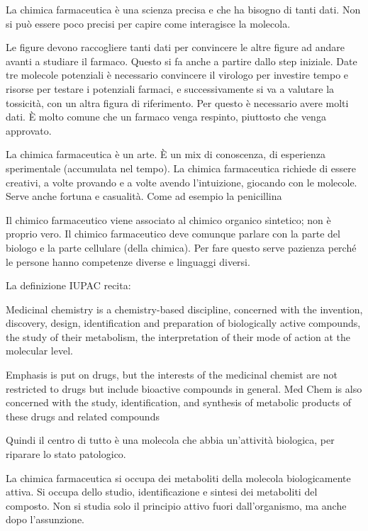 La chimica farmaceutica è una scienza precisa e che ha bisogno di tanti
dati. Non si può essere poco precisi per capire come interagisce la
molecola.

Le figure devono raccogliere tanti dati per convincere le altre figure
ad andare avanti a studiare il farmaco. Questo si fa anche a partire
dallo step iniziale. Date tre molecole potenziali è necessario
convincere il virologo per investire tempo e risorse per testare i
potenziali farmaci, e successivamente si va a valutare la tossicità, con
un altra figura di riferimento. Per questo è necessario avere molti
dati. È molto comune che un farmaco venga respinto, piuttosto che venga
approvato.

La chimica farmaceutica è un arte. È un mix di conoscenza, di esperienza
sperimentale (accumulata nel tempo).
La chimica farmaceutica richiede di essere creativi, a volte provando e
a volte avendo l'intuizione, giocando con le molecole.
Serve anche fortuna e casualità. Come ad esempio la penicillina

Il chimico farmaceutico viene associato al chimico organico sintetico;
non è proprio vero. Il chimico farmaceutico deve comunque parlare con la
parte del biologo e la parte cellulare (della chimica). Per fare questo
serve pazienza perché le persone hanno competenze diverse e linguaggi
diversi.

La definizione IUPAC recita:
\begin{quoting}
Medicinal chemistry is a chemistry-based discipline, concerned with the invention, discovery, design, identification and preparation of
biologically active compounds, the study of their metabolism, the
interpretation of their mode of action at the molecular level.
\end{quoting}
\begin{quoting}
Emphasis is put on drugs, but the interests of the medicinal chemist are
not restricted to drugs but include bioactive compounds in general. Med
Chem is also concerned with the study, identification, and synthesis of
metabolic products of these drugs and related compounds
\end{quoting}

Quindi il centro di tutto è una molecola che abbia un'attività
biologica, per riparare lo stato patologico.

La chimica farmaceutica si occupa dei metaboliti della molecola
biologicamente attiva. Si occupa dello studio, identificazione e sintesi
dei metaboliti del composto. Non si studia solo il principio attivo
fuori dall'organismo, ma anche dopo l'assunzione.

